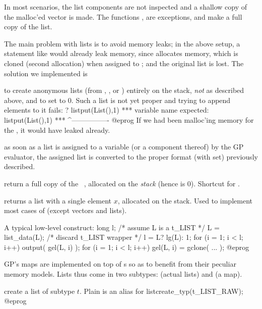 In most  scenarios, the list components are not inspected
and a shallow copy of the malloc'ed vector is made. The functions
,  are exceptions, and make a full copy of
the list.

The main problem with lists is to avoid memory leaks; in the above setup,
a statement like  would already leak memory, since
 allocates memory, which is cloned (second allocation) when
assigned to ; and the original list is lost. The solution we
implemented is

\item to create anonymous lists (from , ,
 or ) entirely on the stack, \emph{not} as described
above, and to set  to $0$. Such a list is not yet proper and
trying to append elements to it fails:
\bprog
? listput(List(),1)
  ***   variable name expected: listput(List(),1)
  ***                                   ^----------------
@eprog\noindent
If we had been malloc'ing memory for the
, it would have leaked already.

\item as soon as a list is assigned to a variable (or a component thereof)
by the GP evaluator, the assigned list is converted to the proper format
(with  set) previously described.

 return a full copy of the ~,
allocated on the \emph{stack} (hence  is $0$). Shortcut for
.

 returns a list with a single element $x$,
allocated on the stack. Used to implement most cases of 
(except vectors and lists).

A typical low-level construct:
\bprog
  long l;
  /* assume L is a t_LIST */
  L = list_data(L); /* discard t_LIST wrapper */
  l = L? lg(L): 1;
  for (i = 1; i < l; i++) output( gel(L, i) );
  for (i = 1; i < l; i++) gel(L, i) = gclone( ... );
@eprog


GP's maps are implemented on top of s so as to benefit from
their peculiar memory models. Lists thus come in two subtypes: 
(actual lists) and  (a map).

 create a list of subtype $t$. Plain
 is an alias for
\bprog
  listcreate_typ(t_LIST_RAW);
@eprog

